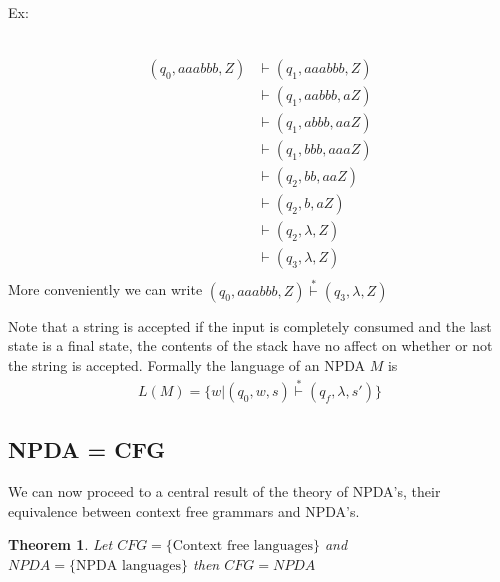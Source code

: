 \documentclass[11pt]{exam}
\newtheorem{theorem}{Theorem}[section]
\begin{document}
Ex:
\begin{center}
\\
\begin{align*}
(q_0,aaabbb,Z) &\vdash (q_1,aaabbb,Z)\\
&\vdash (q_1,aabbb,aZ)\\
&\vdash (q_1,abbb,aaZ)\\
&\vdash (q_1,bbb,aaaZ)\\
&\vdash (q_2,bb,aaZ)\\
&\vdash (q_2,b,aZ)\\
&\vdash (q_2,\lambda,Z)\\
&\vdash (q_3,\lambda,Z)\\
\end{align*}
More conveniently we can write $(q_0,aaabbb,Z) \stackrel{*}{\vdash} (q_3,\lambda,Z)$
\end{center}

Note that a string is accepted if the input is completely consumed and the last state is a final state, the contents of the stack have no affect on whether or not the string is accepted.
Formally the language of an NPDA $M$ is
\begin{align*}
L(M) = \{ w | (q_0,w,s) \stackrel{*}{\vdash} (q_f,\lambda,s') \}
\end{align*}



\subsection{NPDA = CFG}

We can now proceed to a central result of the theory of NPDA's, their equivalence between context free grammars and NPDA's.

\begin{theorem}
Let $CFG = \{ \text{Context free languages} \}$ and $NPDA = \{ \text{NPDA languages} \}$ then $CFG = NPDA$
\end{theorem}
\end{document}
